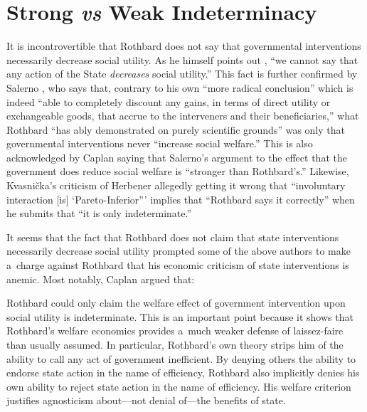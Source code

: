 \section{Strong \textit{vs} Weak Indeterminacy}

It is incontrovertible that Rothbard does not say that governmental interventions necessarily decrease social utility. As he himself points out 
\parencite[][p.100]{rothbard_praxeology_1976}, %
 ``we cannot say that any action of the State \textit{decreases} social utility.'' This fact is further confirmed by Salerno 
\parencite*[][p.131]{salerno_mises_1993}, %
 who says that, contrary to his own ``more radical conclusion'' which is indeed ``able to completely discount any gains, in terms of direct utility or exchangeable goods, that accrue to the interveners and their beneficiaries,'' what Rothbard ``has ably demonstrated on purely scientific grounds'' was only that governmental interventions never ``increase social welfare.'' 
\parencite[][p.131]{salerno_mises_1993} %
 This is also acknowledged by Caplan 
\parencite*[][p.833]{caplan_austrian_1999} %
 saying that Salerno's argument to the effect that the government does reduce social welfare is ``stronger than Rothbard's.'' Likewise, Kvasnička's 
\parencite*[][p.49]{kvasnicka_rothbards_2008} %
 criticism of Herbener 
\parencite*[][pp.103–104]{herbener_pareto_1997} %
 allegedly getting it wrong that ``involuntary interaction [is] ‘Pareto-Inferior''' implies that ``Rothbard says it correctly'' when he submits that ``it is only indeterminate.'' 
\parencite[][p.49]{kvasnicka_rothbards_2008}%




It seems that the fact that Rothbard does not claim that state interventions necessarily decrease social utility prompted some of the above authors to make a~charge against Rothbard that his economic criticism of state interventions is anemic. Most notably, Caplan 
\parencite*[][p.834]{caplan_austrian_1999} %
 argued that:



Rothbard could only claim the welfare effect of government intervention upon social utility is indeterminate. This is an important point because it shows that Rothbard's welfare economics provides a~much weaker defense of laissez-faire than usually assumed. In particular, Rothbard's own theory strips him of the ability to call any act of government inefficient. By denying others the ability to endorse state action in the name of efficiency, Rothbard also implicitly denies his own ability to reject state action in the name of efficiency. His welfare criterion justifies agnosticism about---not denial of---the benefits of state.



